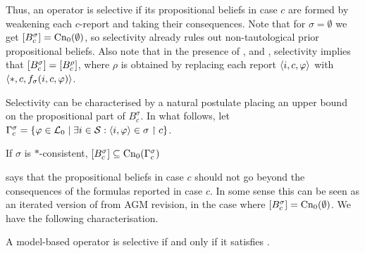 Thus, an operator is selective if its propositional beliefs in case $c$ are
formed by weakening each $c$-report and taking their consequences. Note that for
$\sigma = \emptyset$ we get $\left[{B^\sigma_c}\right] = \operatorname{Cn}_0(\emptyset)$, so
selectivity already rules out non-tautological prior propositional beliefs.
Also note that in the presence of \closure{}, \containment{} and \soundness{},
selectivity implies that $\left[{B^\sigma_c}\right] = \left[{B^\rho_c}\right]$, where
$\rho$ is obtained by replacing each report $\langle {i, c, \varphi} \rangle$ with
$\langle {\ast, c, f_\sigma(i, c, \varphi)} \rangle$.

Selectivity can be characterised by a natural postulate placing an upper bound
on the propositional part of $B^\sigma_c$. In what follows, let
$\Gamma^\sigma_c = \{\varphi \in \mathcal{L}{}_0 \mid \exists i \in \mathcal{S}: \langle {i, \varphi} \rangle
\in \sigma \upharpoonright c\}$.

\begin{postulate}[\boundedness{}]
    If $\sigma$ is $\ast$-consistent, $\left[{B^\sigma_c}\right]
    \subseteq \operatorname{Cn}_0(\Gamma^\sigma_c)$
\end{postulate}

\boundedness{} says that the propositional beliefs in case $c$ should not go
beyond the consequences of the formulas reported in case $c$. In some sense
this can be seen as an iterated version of  from AGM
revision, in the case where $\left[{B^\sigma_c}\right] = \operatorname{Cn}_0(\emptyset)$. We
have the following characterisation.

\begin{theorem}
    \label{kr_thm_selectivity_characterisation}
    A model-based operator is selective if and only if it satisfies
    \boundedness{}.
\end{theorem}

